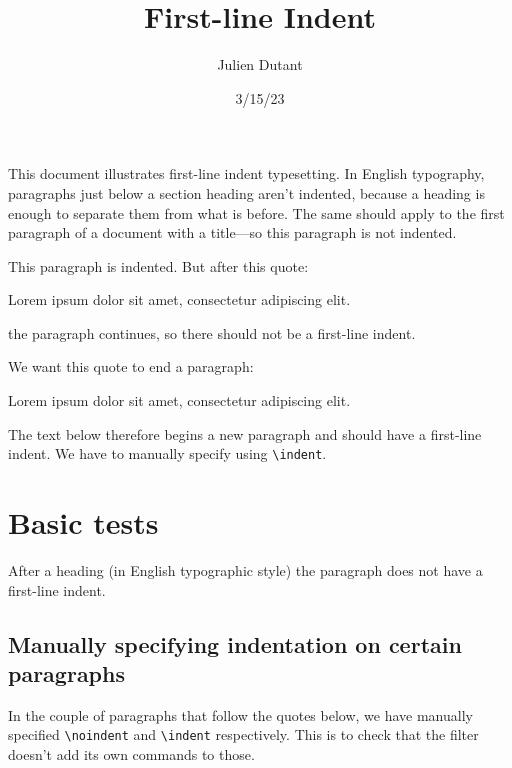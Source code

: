 \documentclass[
  letterpaper,
  DIV=11,
  numbers=noendperiod]{scrartcl}
\title{First-line Indent}
\author{Julien Dutant}
\date{3/15/23}
\makeatletter
\renewenvironment{quote}
     {\list{}{\listparindent 1.5em%
              \itemindent \listparindent
              \rightmargin \leftmargin
              \parsep \z@ \@plus \p@}%
            \item\noindent\relax}
      {\endlist}
\makeatother
\begin{document}
\maketitle
\ifdefined\Shaded\renewenvironment{Shaded}{\begin{tcolorbox}[breakable, enhanced, sharp corners, frame hidden, borderline west={3pt}{0pt}{shadecolor}, interior hidden, boxrule=0pt]}{\end{tcolorbox}}\fi

\noindent This document illustrates first-line indent typesetting. In
English typography, paragraphs just below a section heading aren't
indented, because a heading is enough to separate them from what is
before. The same should apply to the first paragraph of a document with
a title---so this paragraph is not indented.

This paragraph is indented. But after this quote:

\begin{quote}
\noindent Lorem ipsum dolor sit amet, consectetur adipiscing elit.
\end{quote}

\noindent the paragraph continues, so there should not be a first-line
indent.

We want this quote to end a paragraph:

\begin{quote}
\noindent Lorem ipsum dolor sit amet, consectetur adipiscing elit.
\end{quote}

\indent The text below therefore begins a new paragraph and should have
a first-line indent. We have to manually specify using
\texttt{\textbackslash{}indent}.

\hypertarget{basic-tests}{%
\section{Basic tests}\label{basic-tests}}

After a heading (in English typographic style) the paragraph does not
have a first-line indent.

\hypertarget{manually-specifying-indentation-on-certain-paragraphs}{%
\subsection{Manually specifying indentation on certain
paragraphs}\label{manually-specifying-indentation-on-certain-paragraphs}}

In the couple of paragraphs that follow the quotes below, we have
manually specified \texttt{\textbackslash{}noindent} and
\texttt{\textbackslash{}indent} respectively. This is to check that the
filter doesn't add its own commands to those.
\end{document}
